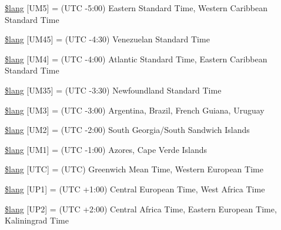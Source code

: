 \begin{DoxyCompactItemize}
\item 
\hyperlink{date__lang_8php_a557150a51633e11dc49e3bfd2e1c091e}{\$lang} \mbox{[}\textquotesingle{}U\+M5\textquotesingle{}\mbox{]} = \textquotesingle{}(U\+T\+C -\/5\+:00) Eastern Standard Time, Western Caribbean Standard Time\textquotesingle{}
\item 
\hyperlink{date__lang_8php_aac9f8a1e0da4b3cee00a19fe9ac642d0}{\$lang} \mbox{[}\textquotesingle{}U\+M45\textquotesingle{}\mbox{]} = \textquotesingle{}(U\+T\+C -\/4\+:30) Venezuelan Standard Time\textquotesingle{}
\item 
\hyperlink{date__lang_8php_a42f66872f4a082bcb2ee004bd2716828}{\$lang} \mbox{[}\textquotesingle{}U\+M4\textquotesingle{}\mbox{]} = \textquotesingle{}(U\+T\+C -\/4\+:00) Atlantic Standard Time, Eastern Caribbean Standard Time\textquotesingle{}
\item 
\hyperlink{date__lang_8php_a389c4a60af83efd29503f60033f3071d}{\$lang} \mbox{[}\textquotesingle{}U\+M35\textquotesingle{}\mbox{]} = \textquotesingle{}(U\+T\+C -\/3\+:30) Newfoundland Standard Time\textquotesingle{}
\item 
\hyperlink{date__lang_8php_abd67512895187d494bbfb18f8d8fee43}{\$lang} \mbox{[}\textquotesingle{}U\+M3\textquotesingle{}\mbox{]} = \textquotesingle{}(U\+T\+C -\/3\+:00) Argentina, Brazil, French Guiana, Uruguay\textquotesingle{}
\item 
\hyperlink{date__lang_8php_a8ee2f132b462bb709fc3402a592ff573}{\$lang} \mbox{[}\textquotesingle{}U\+M2\textquotesingle{}\mbox{]} = \textquotesingle{}(U\+T\+C -\/2\+:00) South Georgia/South Sandwich Islands\textquotesingle{}
\item 
\hyperlink{date__lang_8php_a036e0074236b996b33231b051eda2973}{\$lang} \mbox{[}\textquotesingle{}U\+M1\textquotesingle{}\mbox{]} = \textquotesingle{}(U\+T\+C -\/1\+:00) Azores, Cape Verde Islands\textquotesingle{}
\item 
\hyperlink{date__lang_8php_ab153b3219e74743184b7dee67e86f9fc}{\$lang} \mbox{[}\textquotesingle{}U\+T\+C\textquotesingle{}\mbox{]} = \textquotesingle{}(U\+T\+C) Greenwich Mean Time, Western European Time\textquotesingle{}
\item 
\hyperlink{date__lang_8php_a788996558e6c8cafd788a1fef6b0be4e}{\$lang} \mbox{[}\textquotesingle{}U\+P1\textquotesingle{}\mbox{]} = \textquotesingle{}(U\+T\+C +1\+:00) Central European Time, West Africa Time\textquotesingle{}
\item 
\hyperlink{date__lang_8php_adfeba045961d07f8f30c0f1a7b8b4ff9}{\$lang} \mbox{[}\textquotesingle{}U\+P2\textquotesingle{}\mbox{]} = \textquotesingle{}(U\+T\+C +2\+:00) Central Africa Time, Eastern European Time, Kaliningrad Time\textquotesingle{}

\end{DoxyCompactItemize}
